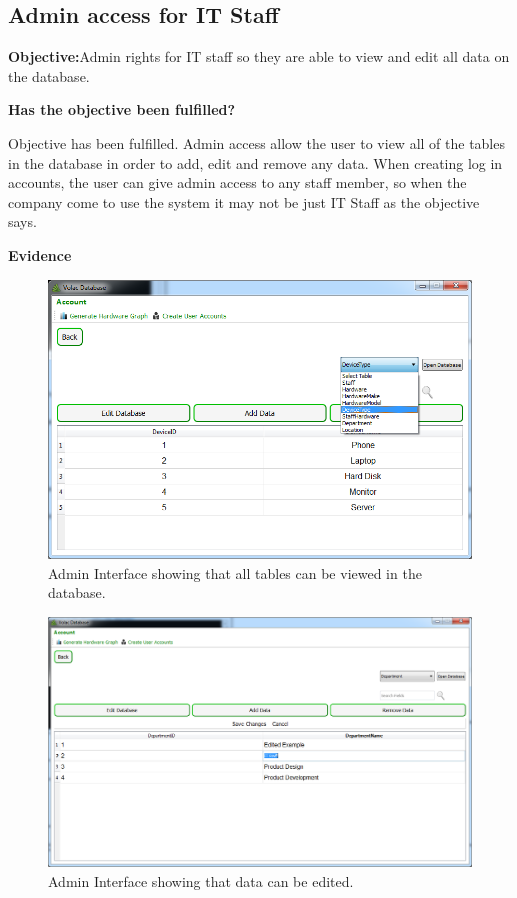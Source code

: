 \subsection{Admin access for IT Staff}\label{admin}

\textbf{Objective:}Admin rights for IT staff so they are able to view and edit all data on the database.

\textbf{Has the objective been fulfilled?}

Objective has been fulfilled. Admin access allow the user to  view all of the tables in the database in order to add, edit and remove any data. When creating log in accounts, the user can give admin access to any staff member, so when the company come to use the system it may not be just IT Staff as the objective says.

\textbf{Evidence}

\begin{figure}[H]
    \includegraphics[width=\textwidth]{./Evaluation/Images/admin1.png}
    \caption{Admin Interface showing that all tables can be viewed in the database.} 
\end{figure}

\begin{figure}[H]
    \includegraphics[width=\textwidth]{./Evaluation/Images/admin2.png}
    \caption{Admin Interface showing that data can be edited.} 
\end{figure}

